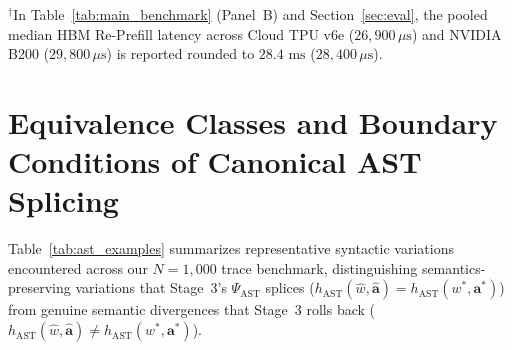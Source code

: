 \documentclass[10pt,conference]{IEEEtran}
\begin{document}
\begin{table}[!t]
\centering
\footnotesize
\renewcommand{\arraystretch}{1.06}
\caption{Microarchitectural Latency Breakdown of Stage 3 SRAM Copy-on-Write Rollback ($T_{\text{rb}}$) vs.\ HBM Re-Prefill}
\label{tab:rollback_breakdown}
\vspace*{1mm}
{\scriptsize $^\dagger$In Table~\ref{tab:main_benchmark} (Panel~B) and Section~\ref{sec:eval}, the pooled median HBM Re-Prefill latency across Cloud TPU v6e ($26{,}900\,\mu\text{s}$) and NVIDIA B200 ($29{,}800\,\mu\text{s}$) is reported rounded to $28.4\text{ ms}$ ($28{,}400\,\mu\text{s}$).}
\end{table}

\section{Equivalence Classes and Boundary Conditions of Canonical AST Splicing}
\label{app:ast_boundary}

Table~\ref{tab:ast_examples} summarizes representative syntactic variations encountered across our $N = 1{,}000$ trace benchmark, distinguishing semantics-preserving variations that Stage~3's $\Psi_{\text{AST}}$ splices ($h_{\text{AST}}(\hat{w}, \hat{\mathbf{a}}) = h_{\text{AST}}(w^*, \mathbf{a}^*)$) from genuine semantic divergences that Stage~3 rolls back ($h_{\text{AST}}(\hat{w}, \hat{\mathbf{a}}) \neq h_{\text{AST}}(w^*, \mathbf{a}^*)$).
\end{document}
